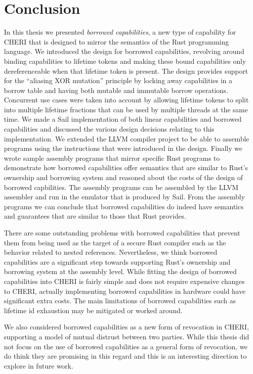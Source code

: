 \chapter{Conclusion}
\label{cha:conclusion}
In this thesis we presented \textit{borrowed capabilities}, a new type of capability for CHERI that is designed to mirror the semantics of the Rust programming language.
We introduced the design for borrowed capabilities, revolving around binding capabilities to lifetime tokens and making these bound capabilities only dereferenceable when that lifetime token is present.
The design provides support for the ``aliasing XOR mutation'' principle by locking away capabilities in a borrow table and having both mutable and immutable borrow operations.
Concurrent use cases were taken into account by allowing lifetime tokens to split into multiple lifetime fractions that can be used by multiple threads at the same time.
We made a Sail implementation of both linear capabilities and borrowed capabilities and discussed the various design decisions relating to this implementation.
We extended the LLVM compiler project to be able to assemble programs using the instructions that were introduced in the design.
Finally we wrote sample assembly programs that mirror specific Rust programs to demonstrate how borrowed capabilities offer semantics that are similar to Rust's ownership and borrowing system and reasoned about the costs of the design of borrowed capbilities.
The assembly programs can be assembled by the LLVM assembler and run in the emulator that is produced by Sail.
From the assembly programs we can conclude that borrowed capabilities do indeed have semantics and guarantees that are similar to those that Rust provides.

There are some outstanding problems with borrowed capabilities that prevent them from being used as the target of a secure Rust compiler such as the behavior related to nested references.
Nevertheless, we think borrowed capabilities are a significant step towards supporting Rust's ownership and borrowing system at the assembly level.
While fitting the design of borrowed capabilities into CHERI is fairly simple and does not require expensive changes to CHERI, actually implementing borrowed capabilities in hardware could have significant extra costs.
The main limitations of borrowed capabilities such as lifetime id exhaustion may be mitigated or worked around.

We also considered borrowed capabilities as a new form of revocation in CHERI, supporting a model of mutual distrust between two parties.
While this thesis did not focus on the use of borrowed capabilities as a general form of revocation, we do think they are promising in this regard and this is an interesting direction to explore in future work.


